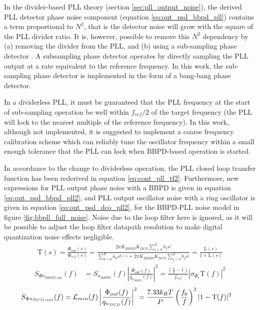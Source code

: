 	In the divider-based PLL theory (section \ref{sec:pll_output_noise}), the derived PLL detector phase noise component (equation \ref{eq:out_psd_bbpd_pll}) contains a term proportional to $N^2$, that is the detector noise will grow with the square of the PLL divider ratio. It is, however, possible to remove this $N^2$ dependency by (a) removing the divider from the PLL, and (b) using a sub-sampling phase detector \cite{Gao2015}. A subsampling phase detector operates by directly sampling the PLL output at a rate equivalent to the reference frequency. In this work, the sub-sampling phase detector is implemented in the form of a bang-bang phase detector.

	 In a dividerless PLL, it must be guaranteed that the PLL frequency at the start of sub-sampling operation be well within $f_{ref}/2$ of the target frequency (the PLL will lock to the nearest multiple of the reference frequency). In this work, although not implemented, it is suggested to implement a coarse frequency calibration scheme which can reliably tune the oscillator frequency within a small enough tolerance that the PLL can lock when BBPD-based operation is started.

	  In accordance to the change to dividerless operation, the PLL closed loop transfer function has been rederived in equation \ref{eq:cont_pll_tf2}. Furthermore, new expressions for PLL output phase noise with a BBPD is given in equation \ref{eq:out_psd_bbpd_pll2}, and PLL output oscillator noise with a ring oscillator is given in equation \ref{eq:out_psd_dco_pll2}, for the BBPD-PLL noise model in figure \ref{fig:bbpll_full_noise}. Noise due to the loop filter here is ignored, as it will be possible to adjust the loop filter datapath resolution to make digital quantization noise effects negligible.
			\begin{align} \label{eq:cont_pll_tf2}
				\mathrm{T}(s) = \frac{\Phi_{out}(s)}{\Phi_{ref}(s)} = \frac{2\pi K_{BBPD}K_{DCO}\sum_{j=0}^Z b_js^j}{\sum_{k=0}^P a_ks^{k+1} + 2\pi K_{BBPD}K_{DCO}\sum_{j=0}^Z b_js^j} = \frac{\mathrm{L}(s)}{1 + \mathrm{L}(s)}
			\end{align}
			\begin{align}\label{eq:out_psd_bbpd_pll2}
				S_{\Phi n_{BBPD,out}}(f) &= S_{n_{BBPD}}(f)\left|\frac{\Phi_{out}(f)}{q_{n_{BBPD}}(f)}\right|^2 = \frac{\left(\frac{\pi}{2}-1\right)}{f_{ref}}\left|\sigma_{\Phi_e}\mathrm{T}(f)\right|^2
			\end{align}
			\begin{align}\label{eq:out_psd_dco_pll2}
				S_{\Phi n_{DCO,out}}(f) &= \mathcal{L}_{min}(f)\left|\frac{\Phi_{out}(f)}{q_{n_{DCO}}(f)}\right|^2 = \frac{7.33k_BT}{P}\left(\frac{f_0}{f}\right)^2|1-\textnormal{T}(f)|^2 
			\end{align}

